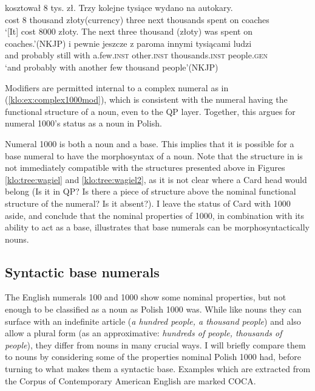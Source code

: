 \documentclass[output=paper]{langscibook}
\begin{document}
\ea \label{klo:ex:mod1000}
\ea \gll {\dots} kosztował 8 tys. zł. Trzy kolejne tysiące wydano na autokary.\\
{} cost 8 thousand złoty(currency) three next thousands spent on coaches\\
\glt `[It] cost 8000 złoty. The next three thousand (złoty) was spent on coaches.'\hfill (NKJP) \label{klo:ex:complex1000mod}
\ex \gll {\dots} i pewnie jeszcze z paroma innymi tysiącami ludzi\\
{} and probably still with a.few.\textsc{inst} other.\textsc{inst} thousands.\textsc{inst} people.\textsc{gen}\\
\glt `and probably with another few thousand people'\hfill (NKJP)
\z \z %

\noindent Modifiers are permitted internal to a complex numeral as in (\ref{klo:ex:complex1000mod}), which is consistent with the numeral having the functional structure of a noun, even to the QP layer. Together, this argues for numeral 1000's status as a noun in Polish.

Numeral 1000 is both a noun and a base. This implies that it is possible for a base numeral to have the morphosyntax of a noun. Note that the structure in  is not immediately compatible with the structures presented above in Figures \ref{klo:tree:wagiel} and \ref{klo:tree:wagiel2}, as it is not clear where a Card head would belong (Is it in QP? Is there a piece of structure above the nominal functional structure of the numeral? Is it absent?). I leave the status of Card with 1000 aside, and conclude that the nominal properties of 1000, in combination with its ability to act as a base, illustrates that base numerals can be morphosyntactically nouns.

\subsection {Syntactic base numerals}

The English numerals 100 and 1000 show some nominal properties, but not enough to be classified as a noun as Polish 1000 was. While like nouns they can surface with an indefinite article (\textit{a hundred people, a thousand people}) and also allow a plural form (as an approximative: \textit{hundreds of people, thousands of people}), they differ from nouns in many crucial ways. I will briefly compare them to nouns by considering some of the properties nominal Polish 1000 had, before turning to what makes them a syntactic base. Examples which are extracted from the Corpus of Contemporary American English are marked COCA.
\end{document}

